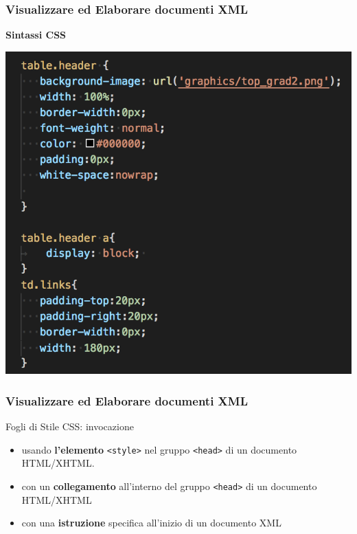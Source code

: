 \documentclass{beamer}
\begin{document}
    \begin{frame}
        \frametitle{Visualizzare ed Elaborare documenti XML}
        \addtocounter{nframe}{1}
        \begin{center}
            \textbf{Sintassi CSS}
        \end{center}
       
        \begin{center}
            \includegraphics[width=.8\textwidth]{imgs/css-sintassi.png}
        \end{center}
    
    \end{frame}

    \begin{frame}
        \frametitle{Visualizzare ed Elaborare documenti XML}
        \addtocounter{nframe}{1}
        \begin{block}{Fogli di Stile CSS: invocazione}
            
            \begin{itemize}
                \item usando \textbf{l’elemento} \texttt{<style>} nel gruppo \texttt{<head>} di un documento
                HTML/XHTML.
                \item con un \textbf{collegamento} all’interno del gruppo \texttt{<head>} di un documento HTML/XHTML
                \item con una \textbf{istruzione} specifica all’inizio di un documento XML
            \end{itemize}
         \end{block}
    
    \end{frame}
\end{document}

